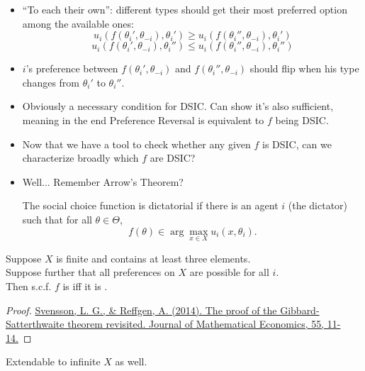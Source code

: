 \documentclass[english,handout]{beamer}		%
\def\lyxframeend{} %
\begin{document}
\begin{itemize}
	\item ``To each their own'': different types should get their most preferred option among the available ones:
	$$ u_{i}(f(\theta_{i}', \theta_{-i}), \theta_{i}') \geq u_{i}(f(\theta_{i}'', \theta_{-i}), \theta_{i}')$$
	$$ u_{i}(f(\theta_{i}', \theta_{-i}), \theta_{i}'') \leq u_{i}(f(\theta_{i}'', \theta_{-i}), \theta_{i}'')$$
	\item $i$'s preference between $f(\theta_{i}', \theta_{-i})$ and $f(\theta_{i}'', \theta_{-i})$ should flip when his type changes from $\theta_i'$ to $\theta_i''$.
	\item Obviously a necessary condition for DSIC. Can show it's also sufficient, meaning in the end Preference Reversal is equivalent to $f$ being DSIC.
\end{itemize}
\lyxframeend


\begin{itemize}
	\item Now that we have a tool to check whether any given $f$ is DSIC, can we characterize broadly which $f$ are DSIC?
	\pause
	\item Well... Remember Arrow's Theorem?
	\pause
	\begin{definition}[Dictatorial s.c.f.]
		The social choice function is dictatorial if there is an agent $i$ (the dictator) such that for all $\theta\in\Theta$,
		$$ f(\theta)\in \arg \max_{x \in X} u_i(x,\theta_i).$$
	\end{definition}
\end{itemize}
\lyxframeend


\begin{theorem}
	Suppose $X$ is finite and contains at least three elements. \\
	Suppose further that all preferences on $X$ are possible for all $i$.\\ 
	Then s.c.f. $f$ is  \alert{iff} it is .
\end{theorem}
\begin{proof}[Proof]
	\href{http://dx.doi.org/10.1016/j.jmateco.2014.09.007}{Svensson, L. G., \& Reffgen, A. (2014). The proof of the Gibbard-Satterthwaite theorem revisited. Journal of Mathematical Economics, 55, 11-14.}
\end{proof}
Extendable to infinite $X$ as well.
\lyxframeend
\end{document}
